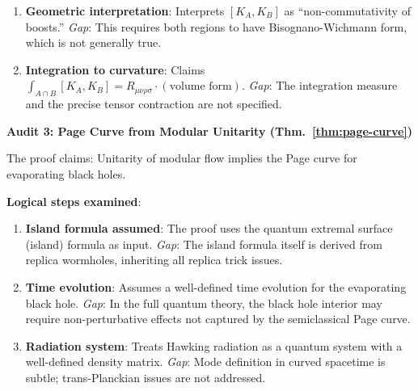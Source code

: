\documentclass[12pt,a4paper]{article}
\begin{document}
\begin{tcolorbox}[colback=red!5!white, colframe=red!75!black, title=\textbf{RED TEAM Round 4: Proof Audits}]
\begin{enumerate}[label=\textbf{Gap \arabic*:}]
    \item \textbf{Geometric interpretation}: Interprets $[K_A, K_B]$ as ``non-commutativity of boosts.'' \emph{Gap}: This requires both regions to have Bisognano-Wichmann form, which is not generally true.
    
    \item \textbf{Integration to curvature}: Claims $\int_{A \cap B} [K_A, K_B] = R_{\mu\nu\rho\sigma} \cdot (\text{volume form})$. \emph{Gap}: The integration measure and the precise tensor contraction are not specified.
\end{enumerate}

\textbf{Audit 3: Page Curve from Modular Unitarity (Thm.~\ref{thm:page-curve})}

The proof claims: Unitarity of modular flow implies the Page curve for evaporating black holes.

\textbf{Logical steps examined}:
\begin{enumerate}[label=\textbf{Gap \arabic*:}]
    \item \textbf{Island formula assumed}: The proof uses the quantum extremal surface (island) formula as input. \emph{Gap}: The island formula itself is derived from replica wormholes, inheriting all replica trick issues.
    
    \item \textbf{Time evolution}: Assumes a well-defined time evolution for the evaporating black hole. \emph{Gap}: In the full quantum theory, the black hole interior may require non-perturbative effects not captured by the semiclassical Page curve.
    
    \item \textbf{Radiation system}: Treats Hawking radiation as a quantum system with a well-defined density matrix. \emph{Gap}: Mode definition in curved spacetime is subtle; trans-Planckian issues are not addressed.
\end{enumerate}

\end{tcolorbox}

\vspace{1em}
\end{document}
